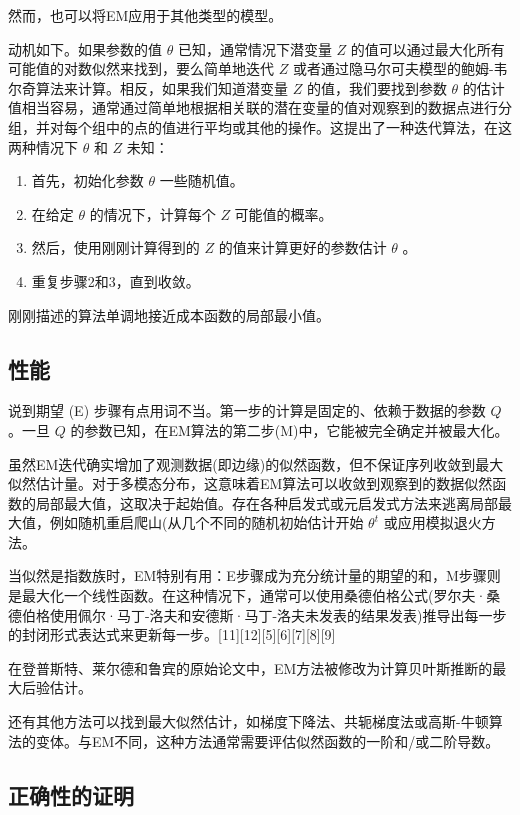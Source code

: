 然而，也可以将EM应用于其他类型的模型。

动机如下。如果参数的值 $\theta$ 已知，通常情况下潜变量 $Z$ 的值可以通过最大化所有可能值的对数似然来找到，要么简单地迭代 $Z$ 或者通过隐马尔可夫模型的鲍姆-韦尔奇算法来计算。相反，如果我们知道潜变量 $Z$ 的值，我们要找到参数 $\theta$ 的估计值相当容易，通常通过简单地根据相关联的潜在变量的值对观察到的数据点进行分组，并对每个组中的点的值进行平均或其他的操作。这提出了一种迭代算法，在这两种情况下 $\theta$ 和 $Z$ 未知：

\begin{enumerate}
\item 首先，初始化参数 $\theta$ 一些随机值。
\item 在给定 $\theta$ 的情况下，计算每个 $Z$ 可能值的概率。
\item 然后，使用刚刚计算得到的 $Z$ 的值来计算更好的参数估计 $\theta$ 。
\item 重复步骤2和3，直到收敛。
\end{enumerate}

刚刚描述的算法单调地接近成本函数的局部最小值。

\subsection{性能}

说到期望 (E) 步骤有点用词不当。第一步的计算是固定的、依赖于数据的参数 $Q$。一旦 $Q$ 的参数已知，在EM算法的第二步(M)中，它能被完全确定并被最大化。

虽然EM迭代确实增加了观测数据(即边缘)的似然函数，但不保证序列收敛到最大似然估计量。对于多模态分布，这意味着EM算法可以收敛到观察到的数据似然函数的局部最大值，这取决于起始值。存在各种启发式或元启发式方法来逃离局部最大值，例如随机重启爬山(从几个不同的随机初始估计开始 $\theta^t$ 或应用模拟退火方法。

当似然是指数族时，EM特别有用：E步骤成为充分统计量的期望的和，M步骤则是最大化一个线性函数。在这种情况下，通常可以使用桑德伯格公式(罗尔夫·桑德伯格使用佩尔·马丁-洛夫和安德斯·马丁-洛夫未发表的结果发表)推导出每一步的封闭形式表达式来更新每一步。[11][12][5][6][7][8][9]

在登普斯特、莱尔德和鲁宾的原始论文中，EM方法被修改为计算贝叶斯推断的最大后验估计。

还有其他方法可以找到最大似然估计，如梯度下降法、共轭梯度法或高斯-牛顿算法的变体。与EM不同，这种方法通常需要评估似然函数的一阶和/或二阶导数。

\subsection{正确性的证明}

